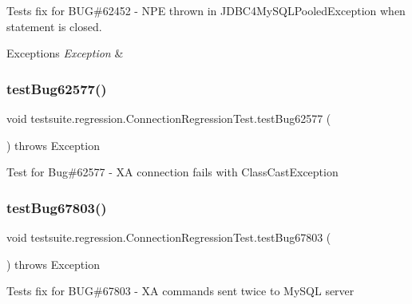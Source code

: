Tests fix for B\+UG\#62452 -\/ N\+PE thrown in J\+D\+B\+C4\+My\+S\+Q\+L\+Pooled\+Exception when statement is closed.


\begin{DoxyExceptions}{Exceptions}
{\em Exception} & \\
\hline
\end{DoxyExceptions}
\mbox{\label{classtestsuite_1_1regression_1_1_connection_regression_test_ae350fa13fa69dbd3f3a7e5b23ee15503}} 
\subsubsection{\texorpdfstring{test\+Bug62577()}{testBug62577()}}
{\footnotesize\ttfamily void testsuite.\+regression.\+Connection\+Regression\+Test.\+test\+Bug62577 (\begin{DoxyParamCaption}{ }\end{DoxyParamCaption}) throws Exception}

Test for Bug\#62577 -\/ XA connection fails with Class\+Cast\+Exception \mbox{\label{classtestsuite_1_1regression_1_1_connection_regression_test_a4ac113ac44c3a4432d84e3a3c062da8f}} 
\subsubsection{\texorpdfstring{test\+Bug67803()}{testBug67803()}}
{\footnotesize\ttfamily void testsuite.\+regression.\+Connection\+Regression\+Test.\+test\+Bug67803 (\begin{DoxyParamCaption}{ }\end{DoxyParamCaption}) throws Exception}

Tests fix for B\+UG\#67803 -\/ XA commands sent twice to My\+S\+QL server


